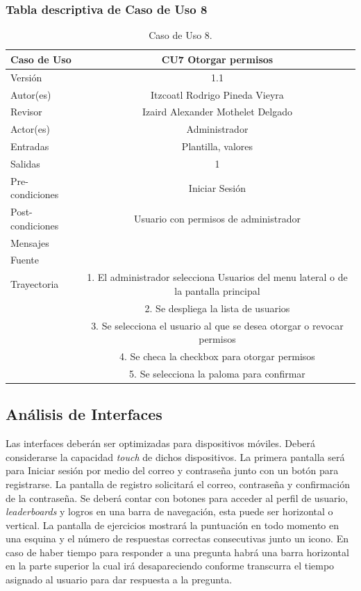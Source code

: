 \documentclass{article}
\begin{document}
\subsubsection{Tabla descriptiva de Caso de Uso 8}
\begin{table}[H]
\caption{Caso de Uso 8.}
\begin{tabular}{|M{5cm}|c|}

\hline
Caso de Uso & CU7 Otorgar permisos\\ \hline
Versión & 1.1\\ \hline
Autor(es) & Itzcoatl Rodrigo Pineda Vieyra \\ \hline
Revisor &  Izaird Alexander Mothelet Delgado \\ \hline
Actor(es) & Administrador \\ \hline
Entradas &  Plantilla, valores \\ \hline
Salidas & 1 \\ \hline
Pre-condiciones & Iniciar Sesión  \\ \hline
Post-condiciones & Usuario con permisos de administrador\\ \hline
Mensajes & \\
Fuente &  \\ \hline	
	Trayectoria
		& 1. El administrador selecciona Usuarios del menu lateral o de la pantalla principal \\
		& 2. Se despliega la lista de usuarios\\ 
		& 3. Se selecciona el usuario al que se desea otorgar o revocar permisos \\
		& 4. Se checa la checkbox para otorgar permisos\\
		& 5. Se selecciona la paloma para confirmar\\		
		\hline
\end{tabular}

\end{table}


\subsection{Análisis de Interfaces}
Las interfaces deberán ser optimizadas para dispositivos móviles. Deberá considerarse la capacidad \emph{touch} de dichos dispositivos. La primera pantalla será para Iniciar sesión por medio del correo y contraseña junto con un botón para registrarse. La pantalla de registro solicitará el correo, contraseña y confirmación de la contraseña. Se deberá contar con botones para acceder al perfil de usuario, \emph{leaderboards} y logros en una barra de navegación, esta puede ser horizontal o vertical. La pantalla de ejercicios mostrará la puntuación en todo momento en una esquina y el número de respuestas correctas consecutivas junto un icono. En caso de haber tiempo para responder a una pregunta habrá una barra horizontal en la parte superior la cual irá desapareciendo conforme transcurra el tiempo asignado al usuario para dar respuesta a la pregunta.
\end{document}
